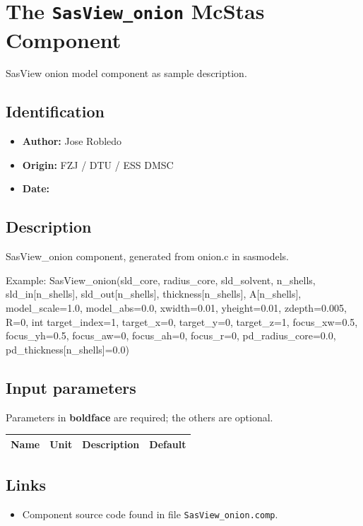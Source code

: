 \section{The \texttt{SasView\_onion} McStas Component}
SasView onion model component as sample description.

\subsection*{Identification}
\begin{itemize}
  \item \textbf{Author:} Jose Robledo
  \item \textbf{Origin:} FZJ / DTU / ESS DMSC
  \item \textbf{Date:} 
\end{itemize}

\subsection*{Description}
SasView\_onion component, generated from onion.c in sasmodels.

Example: SasView\_onion(sld\_core, radius\_core, sld\_solvent, n\_shells, sld\_in[n\_shells], sld\_out[n\_shells], thickness[n\_shells], A[n\_shells], model\_scale=1.0, model\_abs=0.0, xwidth=0.01, yheight=0.01, zdepth=0.005, R=0, int target\_index=1, target\_x=0, target\_y=0, target\_z=1, focus\_xw=0.5, focus\_yh=0.5, focus\_aw=0, focus\_ah=0, focus\_r=0, pd\_radius\_core=0.0, pd\_thickness[n\_shells]=0.0)

\subsection*{Input parameters}
Parameters in \textbf{boldface} are required; the others are optional.

\begin{longtable}{p{}p{}p{}p{}}
\toprule
\textbf{Name} & \textbf{Unit} & \textbf{Description} & \textbf{Default} \\
\midrule
\endhead
\bottomrule
\end{longtable}

\subsection*{Links}
\begin{itemize}
  \item Component source code found in file \texttt{SasView\_onion.comp}.
\end{itemize}
